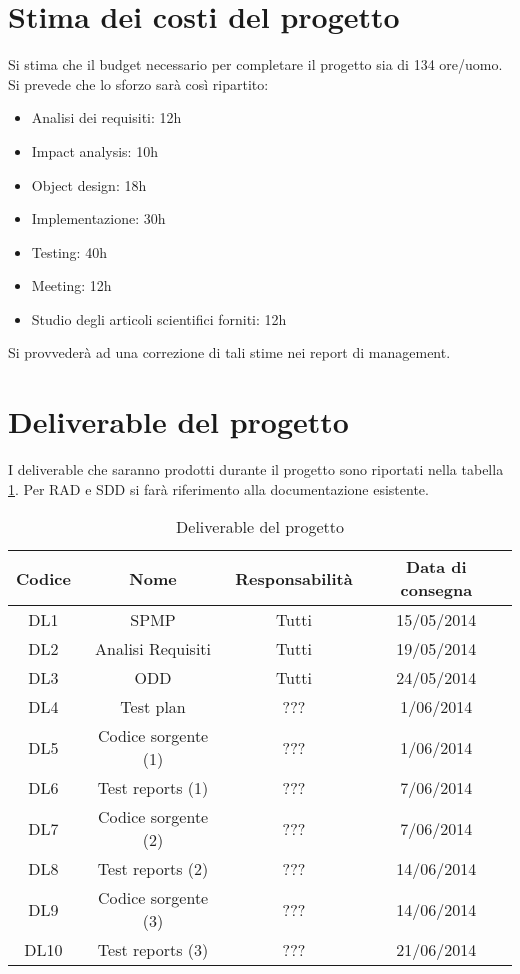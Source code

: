 \section{Stima dei costi del progetto}
Si stima che il budget necessario per completare il progetto sia di 134 ore/uomo. Si prevede che lo sforzo sarà così ripartito:\\
\begin{itemize}
\item Analisi dei requisiti: 12h
\item Impact analysis: 10h
\item Object design: 18h
\item Implementazione: 30h
\item Testing: 40h
\item Meeting: 12h
\item Studio degli articoli scientifici forniti: 12h
\end{itemize}

Si provvederà ad una correzione di tali stime nei report di management.

\section{Deliverable del progetto}
I deliverable che saranno prodotti durante il progetto sono riportati nella tabella \ref{overview:deliverable}. Per RAD e SDD si farà riferimento alla documentazione esistente.

\begin{table}[b]
	\begin{tabular}{|c|c|c|c|}
	\hline
	\textbf{Codice} & \textbf{Nome} & \textbf{Responsabilità} & \textbf{Data di consegna}\\
	\hline
	DL1	& SPMP				& Tutti			 & 15/05/2014\\
	\hline
	DL2	& Analisi Requisiti	& Tutti			 & 19/05/2014\\
	\hline
	DL3	& ODD				& Tutti			 & 24/05/2014\\
	\hline
	DL4 & Test plan			& ???			 & 1/06/2014\\
	\hline
	DL5 & Codice sorgente (1)& ???			 & 1/06/2014\\
	\hline
	DL6 & Test reports (1)	& ???			 & 7/06/2014\\
	\hline
	DL7 & Codice sorgente (2)& ???			 & 7/06/2014\\
	\hline
	DL8 & Test reports (2)	& ???			 & 14/06/2014\\
	\hline
	DL9 & Codice sorgente (3)& ???			 & 14/06/2014\\
	\hline
	DL10& Test reports (3)	& ???			 & 21/06/2014\\
	\hline
	\end{tabular}
	\caption{Deliverable del progetto}
	\label{overview:deliverable}
\end{table}